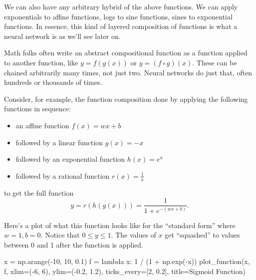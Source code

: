 \documentclass[
  letterpaper,
  DIV=11,
  numbers=noendperiod]{scrreprt}
\newenvironment{Shaded}{\begin{snugshade}}{\end{snugshade}}
\newcommand{\DecValTok}[1]{\textcolor[rgb]{0.68,0.00,0.00}{#1}}
\newcommand{\FloatTok}[1]{\textcolor[rgb]{0.68,0.00,0.00}{#1}}
\newcommand{\KeywordTok}[1]{\textcolor[rgb]{0.00,0.23,0.31}{#1}}
\newcommand{\NormalTok}[1]{\textcolor[rgb]{0.00,0.23,0.31}{#1}}
\newcommand{\OperatorTok}[1]{\textcolor[rgb]{0.37,0.37,0.37}{#1}}
\newcommand{\StringTok}[1]{\textcolor[rgb]{0.13,0.47,0.30}{#1}}
\providecommand{\tightlist}{%
  \setlength{\itemsep}{0pt}\setlength{\parskip}{0pt}}\usepackage{longtable,booktabs,array}
\begin{document}
We can also have any arbitrary hybrid of the above functions. We can
apply exponentials to affine functions, logs to sine functions, sines to
exponential functions. In essence, this kind of layered composition of
functions is what a neural network is as we'll see later on.

Math folks often write an abstract compositional function as a function
applied to another function, like \(y=f(g(x))\) or \(y=(f \circ g)(x)\).
These can be chained arbitrarily many times, not just two. Neural
networks do just that, often hundreds or thousands of times.

Consider, for example, the function composition done by applying the
following functions in sequence:

\begin{itemize}
\tightlist
\item
  an affine function \(f(x) = wx+b\)
\item
  followed by a linear function \(g(x) = -x\)
\item
  followed by an exponential function \(h(x)=e^x\)
\item
  followed by a rational function \(r(x)=\frac{1}{x}\)
\end{itemize}

to get the full function \[y = r(h(g(x))) = \frac{1}{1 + e^{-(wx+b)}}.\]

Here's a plot of what this function looks like for the ``standard form''
where \(w=1, b=0\). Notice that \(0 \leq y \leq 1\). The values of \(x\)
get ``squashed'' to values between 0 and 1 after the function is
applied.

\begin{Shaded}
\begin{Highlighting}[]
\NormalTok{x }\OperatorTok{=}\NormalTok{ np.arange(}\OperatorTok{{-}}\DecValTok{10}\NormalTok{, }\DecValTok{10}\NormalTok{, }\FloatTok{0.1}\NormalTok{)}
\NormalTok{f }\OperatorTok{=} \KeywordTok{lambda}\NormalTok{ x:  }\DecValTok{1} \OperatorTok{/}\NormalTok{ (}\DecValTok{1} \OperatorTok{+}\NormalTok{ np.exp(}\OperatorTok{{-}}\NormalTok{x))}
\NormalTok{plot\_function(x, f, xlim}\OperatorTok{=}\NormalTok{(}\OperatorTok{{-}}\DecValTok{6}\NormalTok{, }\DecValTok{6}\NormalTok{), ylim}\OperatorTok{=}\NormalTok{(}\OperatorTok{{-}}\FloatTok{0.2}\NormalTok{, }\FloatTok{1.2}\NormalTok{), ticks\_every}\OperatorTok{=}\NormalTok{[}\DecValTok{2}\NormalTok{, }\FloatTok{0.2}\NormalTok{], }
\NormalTok{              title}\OperatorTok{=}\StringTok{\textquotesingle{}Sigmoid Function\textquotesingle{}}\NormalTok{)}
\end{Highlighting}
\end{Shaded}
\end{document}
